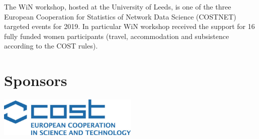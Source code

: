 \begin{center}
The WiN workshop, hosted at the University of Leeds, is one of the three European Cooperation for Statistics of Network Data Science (COSTNET) targeted events for 2019. In particular WiN workshop received the support for 16 fully funded women participants (travel, accommodation and subsistence according to the COST rules).
\end{center}

\vfill

\section{Sponsors}

\begin{center}
\includegraphics[width=0.5\textwidth]{images/logos/Partnerlogos/COST-logo-high-res-700x198.jpg}
\end{center}

\vfill